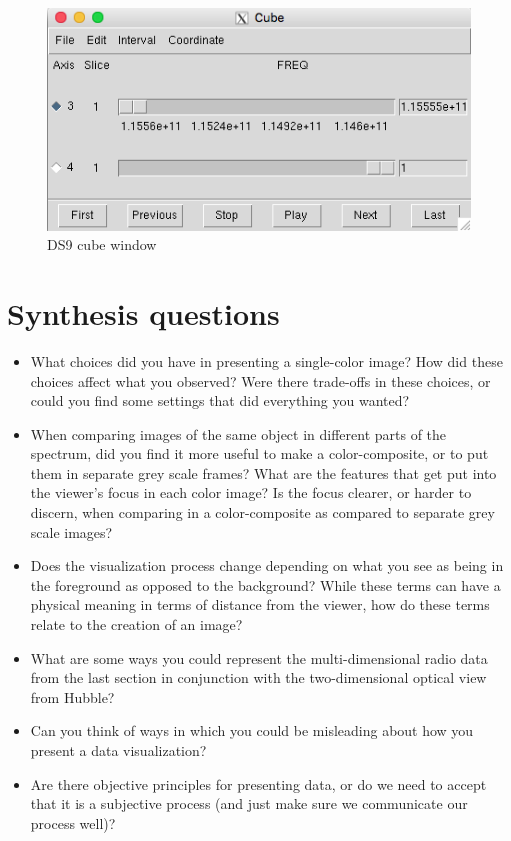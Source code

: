 \documentclass[12pt]{article}
\begin{document}
\begin{figure}[h]
  \centering
  \includegraphics[width=0.6\linewidth]{cube.png}
  \caption{DS9 cube window}
  \label{fig:cube}
\end{figure}

\section{Synthesis questions}
\label{sec:synth}

\begin{itemize}

\item What choices did you have in presenting a single-color image?  How did these choices affect what you observed?  Were there trade-offs in these choices, or could you find some settings that did everything you wanted?

\item When comparing images of the same object in different parts of the spectrum, did you find it more useful to make a color-composite, or to put them in separate grey scale frames?  What are the features that get put into the viewer's focus in each color image?  Is the focus clearer, or harder to discern, when comparing in a color-composite as compared to separate grey scale images?

\item Does the visualization process change depending on what you see as being in the foreground as opposed to the background?  While these terms can have a physical meaning in terms of distance from the viewer, how do these terms relate to the creation of an image?

\item What are some ways you could represent the multi-dimensional radio data from the last section in conjunction with the two-dimensional optical view from Hubble?

\item Can you think of ways in which you could be misleading about how you present a data visualization?

\item Are there objective principles for presenting data, or do we need to accept that it is a subjective process (and just make sure we communicate our process well)?

\end{itemize}
\end{document}
